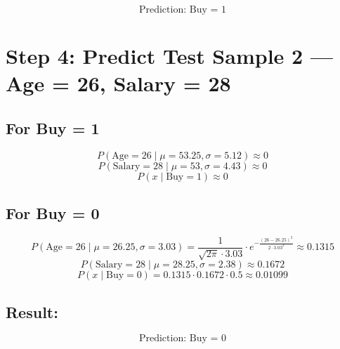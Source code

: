 \documentclass{article}
\begin{document}
\[
\boxed{\text{Prediction: Buy = 1}}
\]

\section*{Step 4: Predict Test Sample 2 — Age = 26, Salary = 28}

\subsection*{For Buy = 1}

\[
P(\text{Age} = 26 \mid \mu = 53.25, \sigma = 5.12) \approx 0
\]
\[
P(\text{Salary} = 28 \mid \mu = 53, \sigma = 4.43) \approx 0
\]
\[
P(x \mid \text{Buy}=1) \approx 0
\]

\subsection*{For Buy = 0}

\[
P(\text{Age} = 26 \mid \mu = 26.25, \sigma = 3.03) = \frac{1}{\sqrt{2\pi} \cdot 3.03} \cdot e^{-\frac{(26 - 26.25)^2}{2 \cdot 3.03^2}} \approx 0.1315
\]
\[
P(\text{Salary} = 28 \mid \mu = 28.25, \sigma = 2.38) \approx 0.1672
\]
\[
P(x \mid \text{Buy}=0) = 0.1315 \cdot 0.1672 \cdot 0.5 \approx 0.01099
\]

\subsection*{Result:}

\[
\boxed{\text{Prediction: Buy = 0}}
\]
\end{document}
